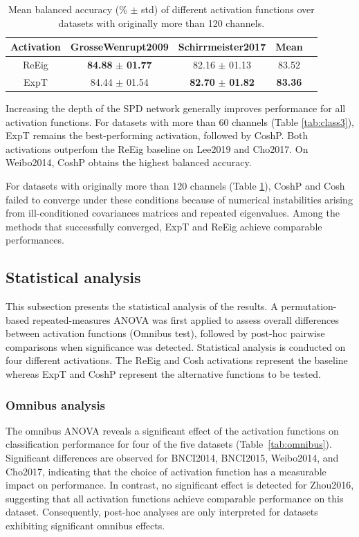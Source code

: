 \documentclass[11pt,a4paper]{article}
\begin{document}
\begin{table}[H]
\centering
\caption{Mean balanced accuracy (\% $\pm$ std) of different activation functions over datasets with originally more than 120 channels.}
\begin{tabular}{|c|c|c|c|c|}
\hline
\textbf{Activation} & \textbf{GrosseWenrupt2009} & \textbf{Schirrmeister2017} & \textbf{Mean}\\
\hline
 ReEig  & \textbf{84.88} $\pm$ \textbf{01.77} &  82.16 $\pm$ 01.13 & 83.52 \\
 ExpT & 84.44 $\pm$ 01.54  &  \textbf{82.70} $\pm$ \textbf{01.82} & \textbf{83.36} \\  
\hline
\end{tabular}
\label{tab:class4}
\end{table}

\noindent Increasing the depth of the SPD network generally improves performance for all activation functions. For datasets with more than 60 channels (Table \ref{tab:class3}), ExpT remains the best-performing activation, followed by CoshP. Both activations outperfom the ReEig baseline on Lee2019 and Cho2017. On Weibo2014, CoshP obtains the highest balanced accuracy. 

\noindent For datasets with originally more than 120 channels (Table \ref{tab:class4}), CoshP and Cosh failed to converge under these conditions because of numerical instabilities arising from ill-conditioned covariances matrices and repeated eigenvalues. Among the methods that successfully converged, ExpT and ReEig achieve comparable performances. \\

\subsection{Statistical analysis}
This subsection presents the statistical analysis of the results. A permutation-based repeated-measures ANOVA was first applied to assess overall differences between activation functions (Omnibus test), followed by post-hoc pairwise comparisons when significance was detected. 
Statistical analysis is conducted on four different activations. The ReEig and Cosh activations represent the baseline whereas ExpT and CoshP represent the alternative functions to be tested.

\subsubsection{Omnibus analysis}
The omnibus ANOVA reveals a significant effect of the activation functions on classification performance for four of the five datasets (Table~\ref{tab:omnibus}). Significant differences are observed for BNCI2014, BNCI2015, Weibo2014, and Cho2017, indicating that the choice of activation function has a measurable impact on performance. In contrast, no significant effect is detected for Zhou2016, suggesting that all activation functions achieve comparable performance on this dataset. Consequently, post-hoc analyses are only interpreted for datasets exhibiting significant omnibus effects.
\end{document}
